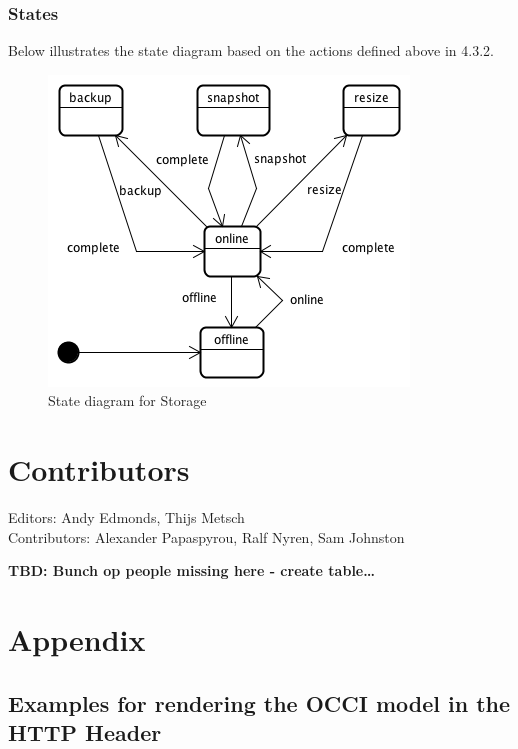 \documentclass[10pt,a4paper]{article}
\begin{document}
\subsubsection{States}
Below illustrates the state diagram based on the actions defined above in 4.3.2.

\begin{figure}[!h]
	\centering
	\includegraphics[scale=0.4]{dia/storage-state.png}
	\caption{State diagram for Storage}
	\label{fig:storage_state}
\end{figure}


\section{Contributors}

Editors: Andy Edmonds, Thijs Metsch \\
Contributors: Alexander Papaspyrou, Ralf Nyren, Sam Johnston

\textbf{TBD: Bunch op people missing here - create table\ldots}

\section{Appendix}

\subsection{Examples for rendering the OCCI model in the HTTP Header}

\begin{verbatim}

\end{verbatim}
\end{document}
